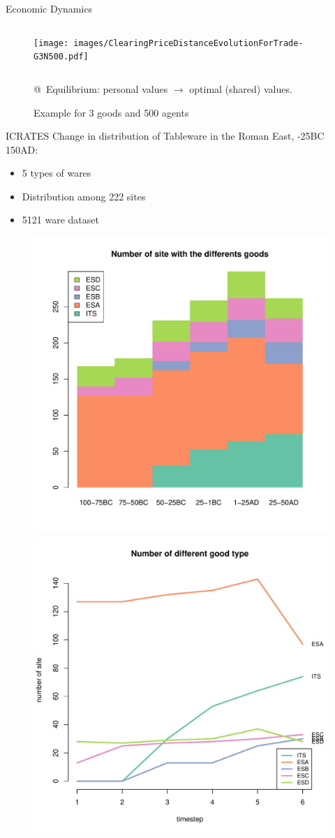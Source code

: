 \documentclass[12pt, notes=show]{beamer}
\begin{document}
\begin{frame}{Economic Dynamics}
	\begin{figure}
	    \caption{Example for 3 goods and 500 agents}
	    \begin{columns}
		\texttt{[image: images/ClearingPriceDistanceEvolutionForTrade-G3N500.pdf]}\\
	    \end{columns}
		@~Equilibrium: personal values  $\rightarrow$ optimal (shared) values.
	\end{figure}
	
\end{frame}



\begin{frame}{ICRATES}
    \footnotesize
    \vspace{.5cm}
Change in distribution of Tableware in the  Roman East, -25BC 150AD:
    \begin{itemize}
	\item 5 types of wares 
	\item Distribution among 222 sites
	\item 5121 ware dataset
 \end{itemize}

 \begin{figure}
     \includegraphics[width=.45\textwidth]{../images/hmNbSiteWGoodData.pdf}
     \includegraphics[width=.45\textwidth]{../images/plotNbSiteWGoodData.pdf}
     
 \end{figure}
\end{frame}
\end{document}
